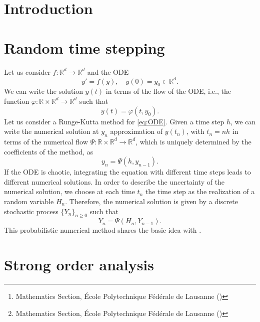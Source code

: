 \documentclass{siamart1116}
\title{{\TheTitle}}
\author{Assyr Abdulle\thanks{Mathematics Section, \'Ecole Polytechnique F\'ed\'erale de Lausanne (\email{assyr.abdulle@epfl.ch})}
	\and
	Giacomo Garegnani\thanks{Mathematics Section, \'Ecole Polytechnique F\'ed\'erale de Lausanne (\email{giacomo.garegnani@epfl.ch})}}
\numberwithin{theorem}{section}
\renewcommand{\phi}{\varphi}
\newcommand{\R}{\mathbb{R}}
\begin{document}
	
\maketitle	

\begin{abstract}
\end{abstract}

\section{Introduction}

\section{Random time stepping}

Let us consider $f\colon\R^d\to\R^d$ and the ODE
\begin{equation}\label{eq:ODE}
	y' = f(y), \quad y(0) = y_0 \in \R^d.
\end{equation}
We can write the solution $y(t)$ in terms of the flow of the ODE, i.e., the function $\phi\colon\R\times\R^d\to\R^d$ such that 
\begin{equation}
	y(t) = \phi(t, y_0).
\end{equation}
Let us consider a Runge-Kutta method for \eqref{eq:ODE}. Given a time step $h$, we can write the numerical solution at $y_n$ approximation of $y(t_n)$, with $t_n = nh$ in terms of the numerical flow $\Psi\colon\R\times\R^d\to\R^d$, which is uniquely determined by the coefficients of the method, as
\begin{equation}
	y_n = \Psi(h, y_{n-1}).
\end{equation}
If the ODE is chaotic, integrating the equation with different time steps leads to different numerical solutions. In order to describe the uncertainty of the numerical solution, we choose at each time $t_n$ the time step as the realization of a random variable $H_n$. Therefore, the numerical solution is given by a discrete stochastic process $\{Y_n\}_{n\geq 0}$ such that
\begin{equation}\label{eq:numHSto}
	Y_n = \Psi(H_n, Y_{n-1}).
\end{equation}
This probabilistic numerical method shares the basic idea with \cite{CGS16}. 

\section{Strong order analysis}
\end{document}
